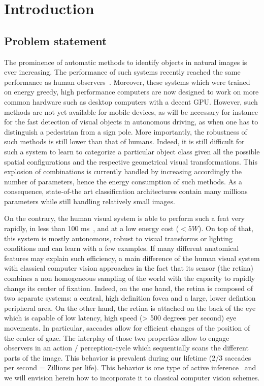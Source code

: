 \section{Introduction}

\subsection{Problem statement}

The prominence of automatic methods to identify objects in natural images is ever increasing. The performance of such systems recently reached the same performance as human observers~\citep{He15}. Moreover, these systems which were trained on energy greedy, high performance computers are now designed to work on more common hardware such as desktop computers with a decent GPU. However, such methods are not yet available for mobile devices, as will be necessary for instance for the fast detection of visual objects in autonomous driving, as when one has to distinguish a pedestrian from a sign pole. More importantly, the robustness of such methods is still lower than that of humans. Indeed, it is still difficult for such a system to learn to categorize a particular object class given all the possible spatial configurations and the respective geometrical visual transformations. This explosion of combinations is currently handled by increasing accordingly the number of parameters, hence the energy consumption of such methods. As a consequence, state-of-the art classification architectures contain many millions parameters while still handling relatively small images.

On the contrary, the human visual system is able to perform such a feat very rapidly, in less than 100 ms~\citep{Kirchner06}, and at a low energy cost ($<5W$). On top of that, this system is mostly autonomous, robust to visual transforms or lighting conditions and can learn with a few examples. If many different anatomical features may explain such efficiency, a main difference of the human visual system with classical computer vision approaches in the fact that its sensor (the retina) combines a non homogeneous sampling of the world with the capacity to rapidly change its center of fixation. Indeed, on the one hand, the retina is composed of two separate systems: a central, high definition fovea and a large, lower defintion peripheral area. On the other hand, the retina is attached on the back of the eye which is capable of low latency, high speed (> 500 degrees per second) eye movements. In particular, saccades allow for efficient changes of the position of the center of gaze. The interplay of those two properties allow to engage observers in an action / perception-cycle which sequentially scans the different parts of the image. This behavior is prevalent during our lifetime (2/3 saccades per second = Zillions per life). This behavior is one type of active inference~\citep{Friston12} and we will envision herein how to incorporate it to classical computer vision schemes.

